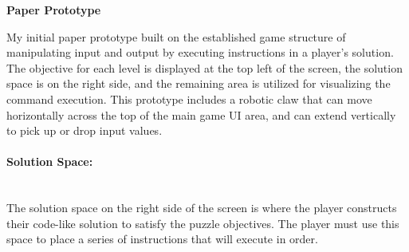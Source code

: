 
\textbf{Paper Prototype}

My initial paper prototype built on the established game structure of manipulating input and output by executing instructions in a player's solution. The objective for each level is displayed at the top left of the screen, the solution space is on the right side, and the remaining area is utilized for visualizing the command execution. This prototype includes a robotic claw that can move horizontally across the top of the main game UI area, and can extend vertically to pick up or drop input values.


\paragraph{Solution Space:} ~\\
The solution space on the right side of the screen is where the player constructs their code-like solution to satisfy the puzzle objectives.
The player must use this space to place a series of instructions that will execute in order.

